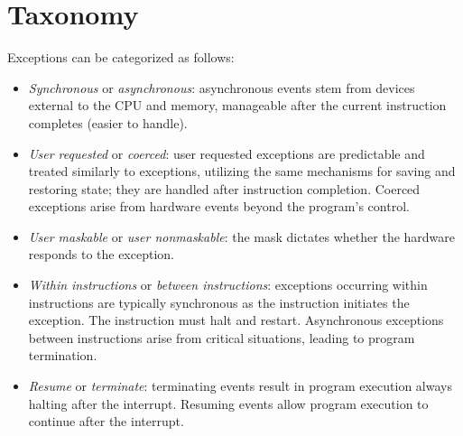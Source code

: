 \section{Taxonomy}

Exceptions can be categorized as follows:
\begin{itemize}
    \item \textit{Synchronous} or \textit{asynchronous}: asynchronous events stem from devices external to the CPU and memory, manageable after the current instruction completes (easier to handle).
    \item \textit{User requested} or \textit{coerced}: user requested exceptions are predictable and treated similarly to exceptions, utilizing the same mechanisms for saving and restoring state; they are handled after instruction completion. 
        Coerced exceptions arise from hardware events beyond the program's control.
    \item \textit{User maskable} or \textit{user nonmaskable}: the mask dictates whether the hardware responds to the exception.
    \item \textit{Within instructions} or \textit{between instructions}: exceptions occurring within instructions are typically synchronous as the instruction initiates the exception.
        The instruction must halt and restart. 
        Asynchronous exceptions between instructions arise from critical situations, leading to program termination.
    \item \textit{Resume} or \textit{terminate}: terminating events result in program execution always halting after the interrupt. 
        Resuming events allow program execution to continue after the interrupt.
\end{itemize}